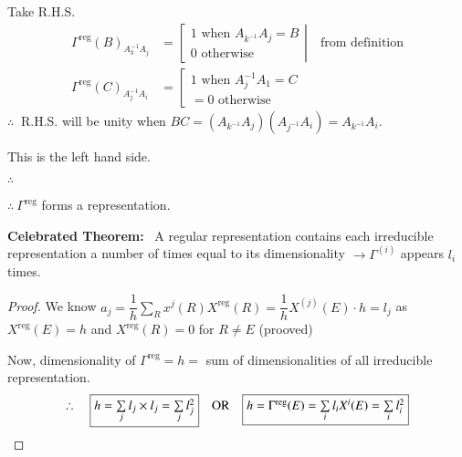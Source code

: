 Take R.H.S.
\begin{align*}
\Gamma^{\text{reg}}(B)_{A^{-1}_{k}A_{j}} &= \left[\left.
\begin{array}{l}
1 \text{ when } A_{k^{-1}}A_{j}=B\\
0 \text{ otherwise}
\end{array}
\right|\right.\quad \text{from definition}\\
\Gamma^{\text{reg}}(C)_{A^{-1}_{j}A_{i}} &= \left[
\begin{array}{l}
1 \text{ when } A^{-1}_{j}A_{1}=C\\
=0 \text{ otherwise}
\end{array}
\right.
\end{align*}
$\therefore \ $ R.H.S. will be unity when $BC=(A_{k^{-1}}A_{j})(A_{j^{-1}}A_{i})=A_{k^{-1}}A_{i}$.

This is the left hand side.

$\therefore \ $ 

$\therefore \ \Gamma^{\text{reg}}$ forms a representation.

\smallskip

\noindent
\textbf{Celebrated Theorem:}~ A regular representation contains each irreducible representation a number of times equal to its dimensionality $\to\Gamma^{(i)}$ appears $l_{i}$ times.

\begin{proof}
We know $a_{j}=\dfrac{1}{h}\sum\limits_{R}x^{j}(R)X^{\text{reg}}(R)=\dfrac{1}{h}X^{(j)}(E)\cdot h=l_{j}$ as $X^{\text{reg}}(E)=h$ and $X^{\text{reg}}(R)=0$ for $R\neq E$ (prooved)

Now, dimensionality of $\Gamma^{\text{reg}}=h=$ sum of dimensionalities of all irreducible representation.
$$
\therefore\quad \fbox{$h=\sum\limits_{j}l_{j}\times l_{j}=\sum\limits_{j}l^{2}_{j}$}\quad\text{OR}\quad \fbox{$h=\Gamma^{\text{reg}}(E)=\sum\limits_{i}l_{i}X^{i}(E)=\sum\limits_{i}l_{i}^{2}$}
$$
\end{proof}
